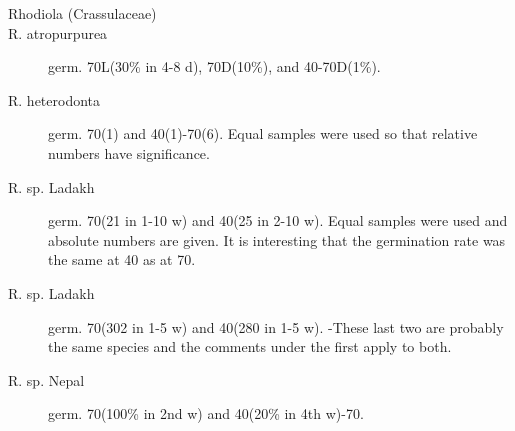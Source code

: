 \begin{description}
\item[Rhodiola (Crassulaceae)]
\item[R. atropurpurea] germ. 70L(30\% in 4-8 d), 70D(10\%), and 40-70D(1\%).
\item[R. heterodonta] germ. 70(1) and 40(1)-70(6). Equal samples were used so that
relative numbers have significance.
\item[R. sp. Ladakh] germ. 70(21 in 1-10 w) and 40(25 in 2-10 w). Equal samples
were used and absolute numbers are given. It is interesting that the germination rate
was the same at 40 as at 70.
\item[R. sp. Ladakh] germ. 70(302 in 1-5 w) and 40(280 in 1-5 w). -These last two are
probably the same species and the comments under the first apply to both.
\item[R. sp. Nepal] germ. 70(100\% in 2nd w) and 40(20\% in 4th w)-70.


\end{description}

